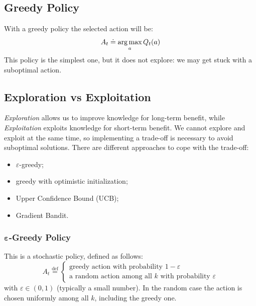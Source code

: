 \subsection{Greedy Policy}
With a greedy policy the selected action will be:
\[A_t\doteq\operatorname*{arg\,max}_{a}Q_t(a)\]
This policy is the simplest one, but it does not explore: we may get stuck with a suboptimal action.

\subsection{Exploration vs Exploitation}
\textit{Exploration} allows us to improve knowledge for long-term benefit, while \textit{Exploitation} exploits knowledge for short-term benefit.
We cannot explore and exploit at the same time, so implementing a trade-off is necessary to avoid suboptimal solutions. There are different approaches to cope with the trade-off:
\begin{itemize}
    \item $\varepsilon$-greedy;
    \item greedy with optimistic initialization;
    \item Upper Confidence Bound (UCB);
    \item Gradient Bandit.
\end{itemize}

\subsubsection{\texorpdfstring{$\boldsymbol{\varepsilon}$}{epsilon}-Greedy Policy}
This is a stochastic policy, defined as follows:
\begin{equation}
  A_t\overset{\text{def}}{=}
  \begin{cases}
    \text{greedy action with probability }1-\varepsilon\\
    \text{a random action among all }k\text{ with probability } \varepsilon
  \end{cases}
\end{equation}
with $\varepsilon\in(0,1)$ (typically a small number). In the random case the action is chosen uniformly among all $k$, including the greedy one.

